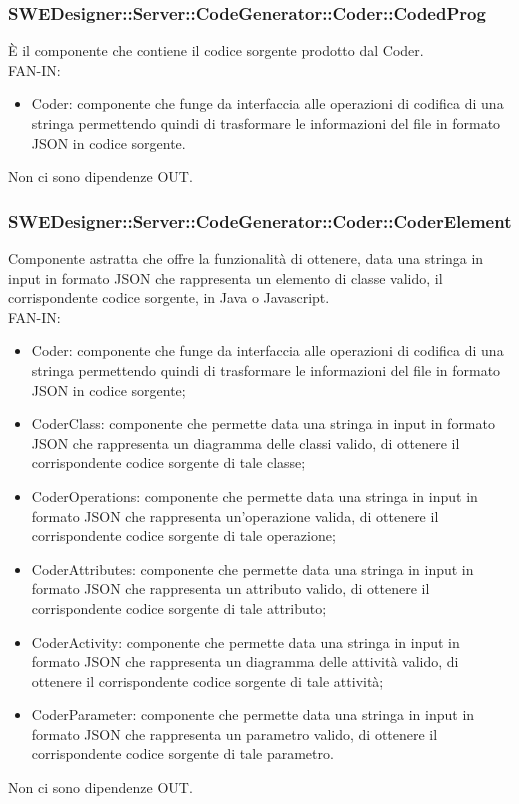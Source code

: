\documentclass[../DefinizioneDiProdotto.tex]{subfiles}
\begin{document}
				\subsubsection{SWEDesigner::Server::CodeGenerator::Coder::CodedProg}
				È il componente che contiene il codice sorgente prodotto dal Coder.\\
					FAN-IN:
					\begin{itemize}
						\item Coder: componente che funge da interfaccia alle operazioni di codifica di una stringa permettendo quindi di trasformare le informazioni del file in formato JSON in codice sorgente.
					\end{itemize}
					Non ci sono dipendenze OUT.
				
				\subsubsection{SWEDesigner::Server::CodeGenerator::Coder::CoderElement}
				Componente astratta che offre la funzionalità di ottenere, data una stringa in input in formato JSON che rappresenta un elemento di classe valido, il corrispondente codice sorgente, in Java o Javascript.\\
					FAN-IN:
					\begin{itemize}
						\item Coder: componente che funge da interfaccia alle operazioni di codifica di una stringa permettendo quindi di trasformare le informazioni del file in formato JSON in codice sorgente;
						\item CoderClass: componente che permette data una stringa in input in formato JSON che rappresenta un diagramma delle classi valido, di ottenere il corrispondente codice sorgente di tale classe;
						\item CoderOperations: componente che permette data una stringa in input in formato JSON che rappresenta un'operazione valida, di ottenere il corrispondente codice sorgente di tale operazione;
						\item CoderAttributes: componente che permette data una stringa in input in formato JSON che rappresenta un attributo valido, di ottenere il corrispondente codice sorgente di tale attributo;
						\item CoderActivity: componente che permette data una stringa in input in formato JSON che rappresenta un diagramma delle attività valido, di ottenere il corrispondente codice sorgente di tale attività;
						\item CoderParameter: componente che permette data una stringa in input in formato JSON che rappresenta un parametro valido, di ottenere il corrispondente codice sorgente di tale parametro.
					\end{itemize}
					Non ci sono dipendenze OUT.
\end{document}
